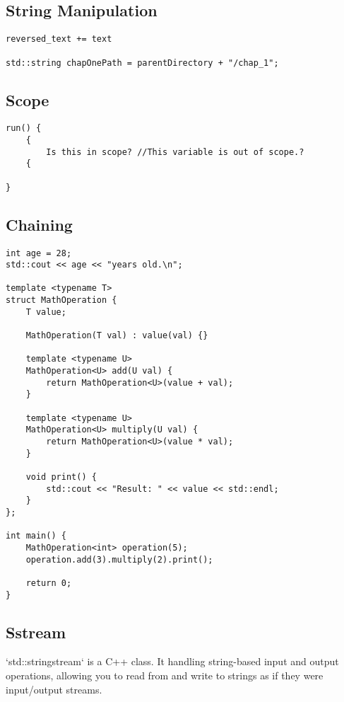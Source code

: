 \subsection{String Manipulation}

\begin{verbatim}
reversed_text += text

std::string chapOnePath = parentDirectory + "/chap_1";
\end{verbatim}

\subsection{Scope}

\begin{verbatim}
run() {
    {
        Is this in scope? //This variable is out of scope.?
    {
    
}
\end{verbatim}

\subsection{Chaining}

\begin{verbatim}
int age = 28;
std::cout << age << "years old.\n";

template <typename T>
struct MathOperation {
    T value;

    MathOperation(T val) : value(val) {}

    template <typename U>
    MathOperation<U> add(U val) {
        return MathOperation<U>(value + val);
    }

    template <typename U>
    MathOperation<U> multiply(U val) {
        return MathOperation<U>(value * val);
    }

    void print() {
        std::cout << "Result: " << value << std::endl;
    }
};

int main() {
    MathOperation<int> operation(5);
    operation.add(3).multiply(2).print();

    return 0;
}
\end{verbatim}

\subsection{Sstream}

`std::stringstream` is a C++ class. It handling string-based input and output operations,
allowing you to read from and write to strings as if they were input/output streams.


